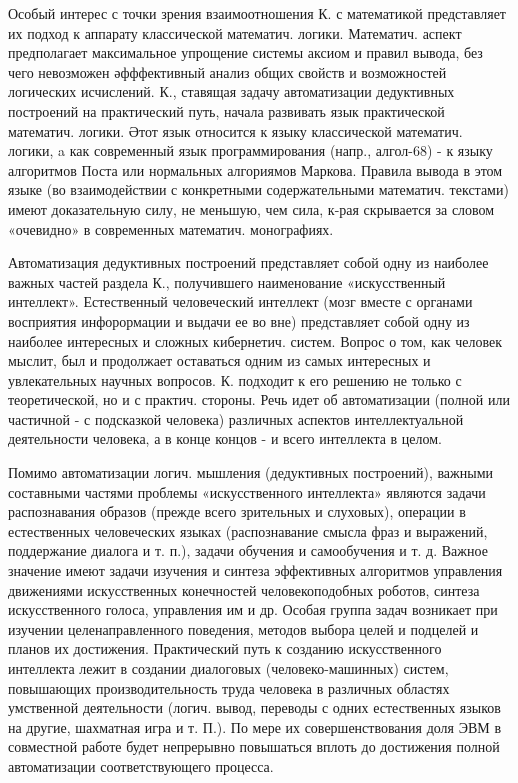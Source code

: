 \documentclass[10pt]{article}
\begin{document}
Особый интерес с точки зрения взаимоотношения К. с математикой представляет их подход к аппарату классической математич. логики. Математич. аспект предполагает максимальное упрощение системы аксиом и правил вывода, без чего невозможен әфффективный анализ общих свойств и возможностей логических исчислений. К., ставящая задачу автоматизации дедуктивных построений на практический путь, начала развивать язык практической математич. логики. Әтот язык относится к языку классической математич. логики, a как современный язык программирования (напр., алгол-68) - к языку алгоритмов Поста или нормальных алгориямов Маркова. Правила вывода в этом языке (во взаимодействии с конкретными содержательными математич. текстами) имеют доказательную силу, не меньшую, чем сила, к-рая скрывается за словом «очевидно» в современных математич. монографиях.



Автоматизация дедуктивных построений представляет собой одну из наиболее важных частей раздела К., получившего наименование «искусственный интеллект». Естественный человеческий интеллект (мозг вместе с органами восприятия инфорормации и выдачи ее во вне) представляет собой одну из наиболее интересных и сложных кибернетич. систем. Вопрос о том, как человек мыслит, был и продолжает оставаться одним из самых интересных и увлекательных научных вопросов. К. подходит к его решению не только с теоретической, но и с практич. стороны. Речь идет об автоматизации (полной или частичной - с подсказкой человека) различных аспектов интеллектуальной деятельности человека, а в конце концов - и всего интеллекта в целом.



Помимо автоматизации логич. мышления (дедуктивных построений), важными составными частями проблемы «искусственного интеллекта» являются задачи распознавания образов (прежде всего зрительных и слуховых), операции в естественных человеческих языках (распознавание смысла фраз и выражений, поддержание диалога и т. п.), задачи обучения и самообучения и т. д. Важное значение имеют задачи изучения и синтеза эффективных алгоритмов управления движениями искусственных конечностей человекоподобных роботов, синтеза искусственного голоса, управления им и др. Особая группа задач возникает при изучении целенаправленного поведения, методов выбора целей и подцелей и планов их достижения. Практический путь к созданию искусственного интеллекта лежит в создании диалоговых (человеко-машинных) систем, повышающих производительность труда человека в различных областях умственной деятельности (логич. вывод, переводы с одних естественных языков на другие, шахматная игра и т. П.). По мере их совершенствования доля ЭВМ в совместной работе будет непрерывно повышаться вплоть до достижения полной автоматизации соответствующего процесса.
\end{document}
